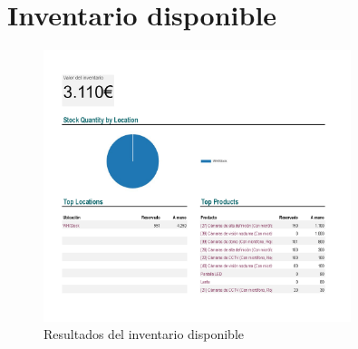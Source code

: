 \documentclass{report}
\begin{document}
        \section*{Inventario disponible}
            \begin{figure}[H]
                \centering
                \includegraphics[width=0.8\textwidth]{./img/InventarioDisponible1.png}
                \caption{Resultados del inventario disponible}
            \end{figure}
\end{document}
